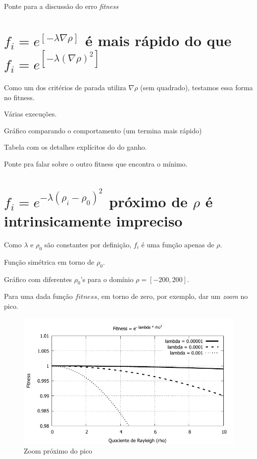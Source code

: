	
	Ponte para a discussão do erro \textit{fitness}
	
	\section{$f_i = e^{[-\lambda \nabla \rho]}$ é mais rápido do que $f_i = e^{[-\lambda (\nabla \rho)^2]}$}
	
	Como um dos critérios de parada utiliza $\nabla \rho$ (sem quadrado), testamos essa forma no fitness.
	
	Várias execuções.
	
	Gráfico comparando o comportamento (um termina mais rápido)
	
	Tabela com os detalhes explícitos do do ganho.
	
	Ponte pra falar sobre o outro fitness que encontra o mínimo.
	
	
\section{$f_i = e^{-\lambda(\rho_i - \rho_0)^2}$ próximo de $\rho$ é intrinsicamente impreciso}
	
	Como $\lambda$ e $\rho_0$ são constantes por definição, $f_i$ é uma função apenas de $\rho$.
	
	Função simétrica em torno de $\rho_0$.
	
	Gráfico com diferentes $\rho_0$'s para o domínio $\rho = [-200,200]$. 
	
	Para uma dada função $fitness$, em torno de zero, por exemplo, dar um \textit{zoom} no pico.
	
	\begin{figure}[htbp]
		\centering
			\includegraphics{figs/varios-fit-mono-zoom.pdf}
		\caption{Zoom próximo do pico}
		\label{fig:varios-fit-mono-zoom}
	\end{figure}
	
